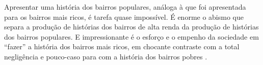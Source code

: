 \begin{citacao}
Apresentar uma história dos bairros populares, análoga à que foi apresentada para os bairros mais ricos, é tarefa quase impossível. É enorme o abismo que separa a produção de histórias dos bairros de alta renda da produção de histórias dos bairros populares. E impressionante é o esforço e o empenho da sociedade em ``fazer'' a história dos bairros mais ricos, em chocante contraste com a total negligência e pouco-caso para com a história dos bairros pobres \cite[p.~226]{villaca_intraurbano_2017}.
\end{citacao}




